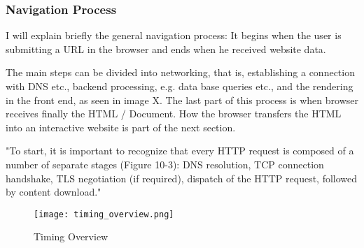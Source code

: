 







\subsubsection{Navigation Process}

I will explain briefly the general navigation process: It begins when the user is submitting a URL in the browser and ends when he received website data.

The main steps can be divided into networking, that is, establishing a connection with DNS etc., backend processing, e.g. data base queries etc., and the rendering in the front end, as seen in image X.
The last part of this process is when browser receives finally the HTML / Document. 
How the browser transfers the HTML into an interactive website is part of the next section.


"To start, it is important to recognize that every HTTP request is composed of a number of separate stages (Figure 10-3): DNS resolution, TCP connection handshake, TLS negotiation (if required), dispatch of the HTTP request, followed by content download." %


\begin{figure}[h!]
\begin{center}
\texttt{[image: timing\_overview.png]}
\caption{Timing Overview}
\label{img:timing_overview}
\end{center}
\end{figure}





